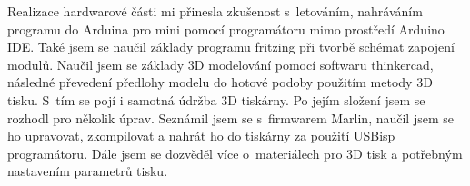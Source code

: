 \documentclass[11pt,a4paper,twoside,openright]{report}
\let\openright=\cleardoublepage
\begin{document}
	
	Realizace hardwarové části mi přinesla zkušenost s~letováním, nahráváním programu do Arduina pro mini pomocí programátoru mimo prostředí Arduino IDE. Také jsem se naučil základy programu fritzing při tvorbě schémat zapojení modulů. Naučil jsem se základy 3D modelování pomocí softwaru thinkercad, následné převedení předlohy modelu do hotové podoby použitím metody 3D tisku. S~tím se pojí i samotná údržba 3D tiskárny. Po jejím složení jsem se rozhodl pro několik úprav. Seznámil jsem se s~firmwarem Marlin, naučil jsem se ho upravovat, zkompilovat a nahrát ho do tiskárny za použití USBisp programátoru. Dále jsem se dozvěděl více o~materiálech pro 3D tisk a potřebným nastavením parametrů tisku.
	
	
	\nocite{maly}\nocite{ucebnice}\nocite{polovodicovatechnika}\nocite{šrait}\nocite{techtutorials}\nocite{medium}\nocite{stack}
	\printbibliography[title={Seznam použité literatury},heading={bibintoc}]
	
	\openright
	\listoffigures
	
	\clearpage
	\listoftables
	
	
	
\end{document}
